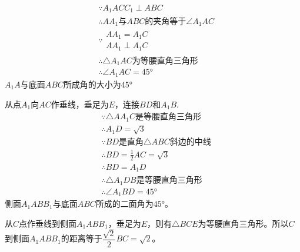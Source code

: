 \documentclass[answers]{exam}
\begin{document}
\begin{questions}
\begin{figure*}[ht]
	\end{figure*}

	\begin{solution}
		\begin{penum}
			\item
			\begin{align*}
				 & \because A_1ACC_1 \perp ABC                         \\
				 & \therefore AA_1\text{与}ABC\text{的夹角等于}\angle{A_1AC} \\
				 & \because
				\begin{array}{l}
					AA_1 = A_1C \\
					AA_1 \perp A_1C
				\end{array}                                        \\
				 & \therefore \triangle{A_1AC}\text{为等腰直角三角形}          \\
				 & \therefore \angle{A_1AC} = \ang{45}
			\end{align*}
			$A_1A$与底面$ABC$所成角的大小为$\ang{45}$
			\item 从点$A_1$向$AC$作垂线，垂足为$E$，连接$BD$和$A_1B$.
			\begin{align*}
				 & \because \triangle{AA_1C}\text{是等腰直角三角形}        \\
				 & \therefore A_1D = \sqrt{3}                      \\
				 & \because BD\text{是直角}\triangle{ABC}\text{斜边的中线} \\
				 & \therefore BD = \frac12AC = \sqrt{3}            \\
				 & \therefore BD = A_1D                            \\
				 & \therefore \triangle{A_1DB}\text{是等腰直角三角形}      \\
				 & \therefore \angle{A_1BD} = \ang{45}
			\end{align*}
			侧面$A_1ABB_1$与底面$ABC$所成的二面角为$\ang{45}$。
			\item
			从$C$点作垂线到侧面$A_1ABB_1$，垂足为$E$，则有$\triangle{BCE}$为等腰直角三角形。所以$C$到侧面$A_1ABB_1$的距离等于$\dfrac{\sqrt{2}}{2}BC
				= \sqrt{2}$。
		\end{penum}
	\end{solution}
\end{questions}
\end{document}
